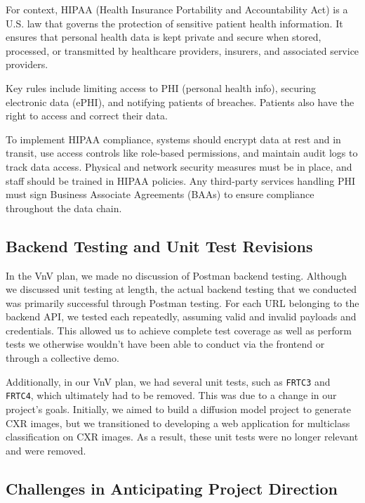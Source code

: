 \documentclass[12pt, titlepage]{article}
\begin{document}
\begin{enumerate}
  For context, HIPAA (Health Insurance Portability and Accountability Act) is a U.S. law that governs the protection of sensitive patient health information. It ensures that personal health data is kept private and secure when stored, processed, or transmitted by healthcare providers, insurers, and associated service providers.

  Key rules include limiting access to PHI (personal health info), securing electronic data (ePHI), and notifying patients of breaches. Patients also have the right to access and correct their data.

  To implement HIPAA compliance, systems should encrypt data at rest and in transit, use access controls like role-based permissions, and maintain audit logs to track data access. Physical and network security measures must be in place, and staff should be trained in HIPAA policies. Any third-party services handling PHI must sign Business Associate Agreements (BAAs) to ensure compliance throughout the data chain.
  
  \subsection{Backend Testing and Unit Test Revisions}
  
  In the VnV plan, we made no discussion of Postman backend testing. Although we discussed unit testing at length, the actual backend testing that we conducted was primarily successful through Postman testing. For each URL belonging to the backend API, we tested each repeatedly, assuming valid and invalid payloads and credentials. This allowed us to achieve complete test coverage as well as perform tests we otherwise wouldn't have been able to conduct via the frontend or through a collective demo.
  
  Additionally, in our VnV plan, we had several unit tests, such as \texttt{FRTC3} and \texttt{FRTC4}, which ultimately had to be removed. This was due to a change in our project's goals. Initially, we aimed to build a diffusion model project to generate CXR images, but we transitioned to developing a web application for multiclass classification on CXR images. As a result, these unit tests were no longer relevant and were removed.
  
  \subsection{Challenges in Anticipating Project Direction}
  

\end{enumerate}
\end{document}
